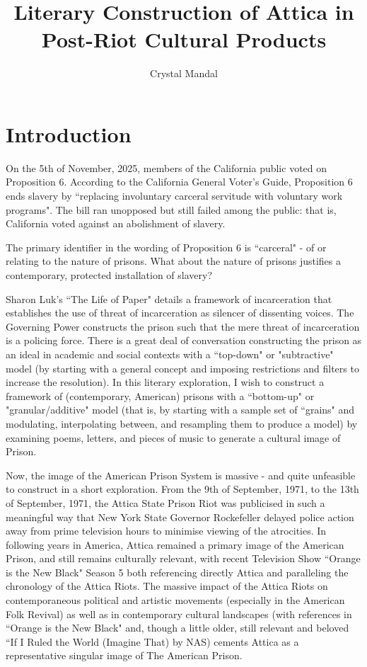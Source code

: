\documentclass[14pt, letterpaper]{report}
\title{ \vspace*{-72pt} Literary Construction of Attica in Post-Riot Cultural Products }
\author{Crystal Mandal}
\date{}
\begin{document}
\maketitle

\section*{Introduction}

	On the 5th of November, 2025, members of the California 
	public voted on Proposition 6. According to the California 
	General Voter's Guide, Proposition 6 ends slavery by 
	``replacing involuntary carceral servitude  with voluntary work 
	programs". The bill ran unopposed but still failed among the 
	public: that is, California voted against an abolishment of 
	slavery.
	
	The primary identifier in the wording of Proposition 
	6 is ``carceral" - of or relating to the nature of prisons. 
	What about the nature of prisons justifies a contemporary,
	protected installation of slavery?
	
	Sharon Luk's ``The Life of Paper" details a framework of 
	incarceration that establishes the use of threat of incarceration 
	as silencer of dissenting voices. The Governing Power constructs 
	the prison such that the mere threat of incarceration is a 
	policing force. There is a great deal of conversation constructing 
	the prison as an ideal in academic and social contexts with a 
	``top-down" or "subtractive" model (by starting with a general 
	concept and imposing restrictions and filters to increase the 
	resolution). In this literary exploration, I wish to construct a 
	framework of (contemporary, American) prisons with a ``bottom-up" 
	or "granular/additive" model (that is, by starting with a sample 
	set of ``grains" and modulating, interpolating between, and 
	resampling them to produce a model) by examining poems, letters, 
	and pieces of music to generate a cultural image of Prison.
	
	Now, the image of the American Prison System is massive - 
	and quite unfeasible to construct in a short exploration. From 
	the 9th of September, 1971, to the 13th of September, 1971, the 
	Attica State Prison Riot was publicised in such a meaningful way 
	that New York State Governor Rockefeller delayed police action away 
	from prime television hours to minimise viewing of the atrocities. 
	In following years in America, Attica remained a primary image of 
	the American Prison, and still remains culturally relevant, with 
	recent Television Show ``Orange is the New Black" Season 5 both 
	referencing directly Attica and paralleling the chronology of the 
	Attica Riots. The massive impact of the Attica Riots on contemporaneous 
	political and artistic movements (especially in the American Folk 
	Revival) as well as in contemporary cultural landscapes (with references 
	in ``Orange is the New Black" and, though a little older, still 
	relevant and beloved ``If I Ruled the World (Imagine That) by NAS) 
	cements Attica as a representative singular image of The American 
	Prison. 
	
\end{document}
